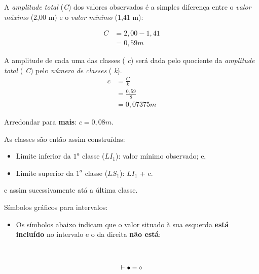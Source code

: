 \documentclass[
]{book}
\providecommand{\tightlist}{%
  \setlength{\itemsep}{0pt}\setlength{\parskip}{0pt}}
\begin{document}
\hfill\break

A \emph{amplitude total} (\emph{C}) dos valores observados é a simples diferença entre o \emph{valor máximo} (2,00 m) e o \emph{valor mínimo} (1,41 m):

\hfill\break

\begin{align*}
C & =2,00-1,41 \\
 & =0,59 m 
\end{align*}

\hfill\break

A amplitude de cada uma das classes ( \emph{c}) será dada pelo quociente da \emph{amplitude total} ( \emph{C}) pelo \emph{número de classes} ( \emph{k}).\\

\begin{align*}
c & = \frac{C}{k} \\
  & = \frac{0,59}{8}\\ 
  & = 0,07375 m
\end{align*}

\hfill\break

Arredondar para \textbf{mais}: \(c=0,08 m\).

\hfill\break

As classes são então assim construídas:

\hfill\break

\begin{itemize}
\tightlist
\item
  Limite inferior da \(1^{a}\) classe (\(LI_{1}\)): valor mínimo observado; e,
\item
  Limite superior da \(1^{a}\) classe (\(LS_{1}\)): \(LI_{1}\) + c.~
\end{itemize}

\hfill\break

e assim sucessivamente atá a última classe.

\hfill\break

Símbolos gráficos para intervalos:

\hfill\break

\begin{itemize}
\tightlist
\item
  Os símbolos abaixo indicam que o valor situado à sua esquerda \textbf{está incluído} no intervalo e o da direita \textbf{não está}:
\end{itemize}

~

\[
\vdash \\
{\bullet}-{\circ}
\]
\end{document}
